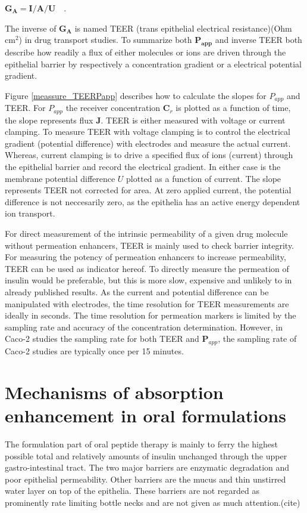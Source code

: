 $\bm{G_A} = \bm{I} / \bm{A} / \bm{U} \quad .$

The inverse of $\bm{G_A}$ is named TEER (trans epithelial electrical resistance)(Ohm cm$^2$) in drug transport studies. To summarize both $\bm{P_{app}}$ and inverse TEER both describe how readily a flux of either molecules or ions are driven through the epithelial barrier by respectively a concentration gradient or a electrical potential gradient.

Figure \ref{meassure_TEERPapp} describes how to calculate the slopes for $P_{app}$ and TEER. For $P_{app}$  the receiver concentration $\bm{C}_r$ is plotted as a function of time, the slope represents flux $\bm{J}$. TEER is either measured with voltage or current clamping. To measure TEER with voltage clamping is to control the electrical gradient (potential difference) with electrodes and measure the actual current. Whereas, current clamping is to drive a specified flux of ions (current) through the epithelial barrier and record the electrical gradient. In either case is the membrane potential difference $U$ plotted as a function of current. The slope represents TEER not corrected for area. At zero applied current, the potential difference is not neccesarily zero, as the epithelia has an active energy dependent ion transport.

For direct measurement of the intrinsic permeability of a given drug molecule without permeation enhancers, TEER is mainly used to check barrier integrity. For measuring the potency of permeation enhancers to increase permeability, TEER can be used as indicator hereof. To directly measure the permeation of insulin would be preferable, but this is more slow, expensive and unlikely to in already published results. As the current and potential difference can be manipulated with electrodes, the time resolution for TEER measurements are ideally in seconds. The time resolution for permeation markers is limited by the sampling rate and accuracy of the concentration determination. However, in Caco-2 studies the sampling rate for both TEER and $\bm{P}_{app}$, the sampling rate of Caco-2 studies are typically once per 15 minutes.

\section{Mechanisms of absorption enhancement in oral formulations}
The formulation part of oral peptide therapy is mainly to ferry the highest possible total and relatively amounts of insulin unchanged through the upper gastro-intestinal tract. The two major barriers are enzymatic degradation and poor epithelial permeability. Other barriers are the mucus and thin unstirred water layer on top of the epithelia. These barriers are not regarded as prominently rate limiting bottle necks and are not given as much attention.(cite)

